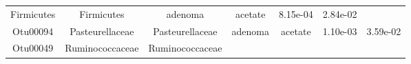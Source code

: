 \documentclass[11pt,]{article}
\begin{document}
\begin{longtable}[]{@{}ccccccc@{}}
\begin{minipage}[t]{0.17\columnwidth}
Firmicutes\strut
\end{minipage} & \begin{minipage}[t]{0.17\columnwidth}\centering\strut
Firmicutes\strut
\end{minipage} & \begin{minipage}[t]{0.09\columnwidth}\centering\strut
adenoma\strut
\end{minipage} & \begin{minipage}[t]{0.11\columnwidth}\centering\strut
acetate\strut
\end{minipage} & \begin{minipage}[t]{0.09\columnwidth}\centering\strut
8.15e-04\strut
\end{minipage} & \begin{minipage}[t]{0.09\columnwidth}\centering\strut
2.84e-02\strut
\end{minipage}\tabularnewline
\begin{minipage}[t]{0.09\columnwidth}\centering\strut
Otu00094\strut
\end{minipage} & \begin{minipage}[t]{0.17\columnwidth}\centering\strut
Pasteurellaceae\strut
\end{minipage} & \begin{minipage}[t]{0.17\columnwidth}\centering\strut
Pasteurellaceae\strut
\end{minipage} & \begin{minipage}[t]{0.09\columnwidth}\centering\strut
adenoma\strut
\end{minipage} & \begin{minipage}[t]{0.11\columnwidth}\centering\strut
acetate\strut
\end{minipage} & \begin{minipage}[t]{0.09\columnwidth}\centering\strut
1.10e-03\strut
\end{minipage} & \begin{minipage}[t]{0.09\columnwidth}\centering\strut
3.59e-02\strut
\end{minipage}\tabularnewline
\begin{minipage}[t]{0.09\columnwidth}\centering\strut
Otu00049\strut
\end{minipage} & \begin{minipage}[t]{0.17\columnwidth}\centering\strut
Ruminococcaceae\strut
\end{minipage} & \begin{minipage}[t]{0.17\columnwidth}\centering\strut
Ruminococcaceae\strut
\end{minipage} & \begin{minipage}[t]{0.09\columnwidth}\centering\strut

\end{minipage}
\end{longtable}
\end{document}
